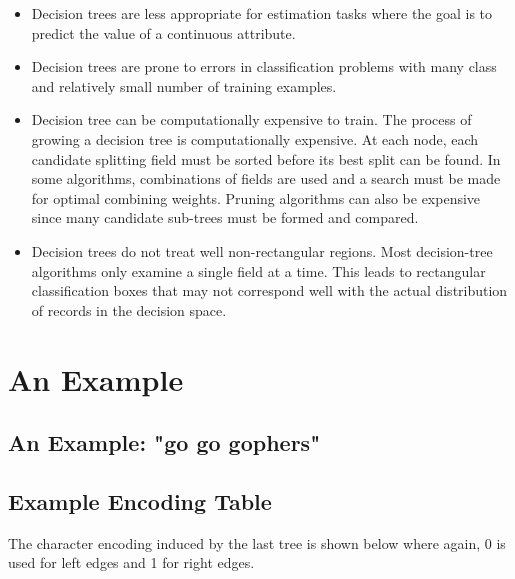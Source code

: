 \documentclass[12pt]{report}
\begin{document}
\begin{itemize}
\item{Decision trees are less appropriate for estimation tasks where the goal is to predict the value of a continuous attribute.}
\item{Decision trees are prone to errors in classification problems with many class and relatively small number of training examples.}
\item{Decision tree can be computationally expensive to train. The process of growing a decision tree is computationally expensive. At each node, each candidate splitting field must be sorted before its best split can be found. In some algorithms, combinations of fields are used and a search must be made for optimal combining weights. Pruning algorithms can also be expensive since many candidate sub-trees must be formed and compared.}
\item{Decision trees do not treat well non-rectangular regions. Most decision-tree algorithms only examine a single field at a time. This leads to rectangular classification boxes that may not correspond well with the actual distribution of records in the decision space. }

\end{itemize}









\section{An Example}

\subsection{An Example: "go go gophers"}


\subsection{Example Encoding Table}

The character encoding induced by the last tree is shown below where again, 0 is used for left edges and 1 for right edges.

\begin{figure}[h!]
	\centering
\end{figure}
\end{document}
